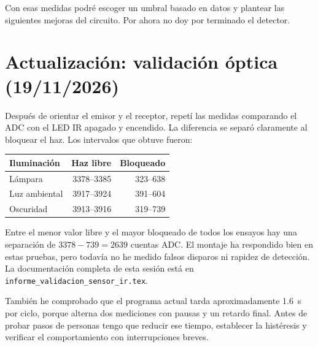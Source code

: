 \documentclass[10pt,a4paper]{article}
\begin{document}
Con esas medidas podré escoger un umbral basado en datos y plantear las siguientes mejoras del circuito. Por ahora no doy por terminado el detector.

\section{Actualización: validación óptica (19/11/2026)}
Después de orientar el emisor y el receptor, repetí las medidas comparando el ADC con el LED IR apagado y encendido. La diferencia se separó claramente al bloquear el haz. Los intervalos que obtuve fueron:
\begin{center}
\begin{tabularx}{\linewidth}{@{}Xrr@{}}
\toprule
Iluminación & Haz libre & Bloqueado\\
\midrule
Lámpara & 3378--3385 & 323--638\\
Luz ambiental & 3917--3924 & 391--604\\
Oscuridad & 3913--3916 & 319--739\\
\bottomrule
\end{tabularx}
\end{center}
Entre el menor valor libre y el mayor bloqueado de todos los ensayos hay una separación de $3378-739=2639$ cuentas ADC. El montaje ha respondido bien en estas pruebas, pero todavía no he medido falsos disparos ni rapidez de detección. La documentación completa de esta sesión está en \texttt{informe\_validacion\_sensor\_ir.tex}.

También he comprobado que el programa actual tarda aproximadamente \SI{1.6}{\second} por ciclo, porque alterna dos mediciones con pausas y un retardo final. Antes de probar pasos de personas tengo que reducir ese tiempo, establecer la histéresis y verificar el comportamiento con interrupciones breves.
\end{document}
